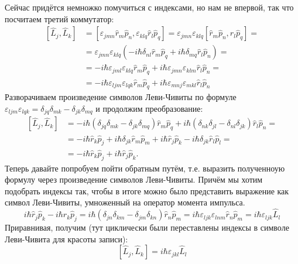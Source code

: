 Сейчас придётся немножко помучиться с индексами, но нам не впервой, так что посчитаем третий коммутатор:
\begin{align*}
    \left[\hat{L}_j, \hat{L}_k\right] &= [\varepsilon_{jmn} \hat{r}_m \hat{p}_n, \varepsilon_{klq} \hat{r}_l\hat{p}_q] = \varepsilon_{jmn}\varepsilon_{klq}[\hat{r}_m \hat{p}_n, \hat{r}_l\hat{p}_q] =\\
    &= \varepsilon_{jmn}\varepsilon_{klq}(-i\hbar\delta_{nl}\hat{r}_m\hat{p}_q + i\hbar\delta_{mq}\hat{r}_l\hat{p}_n) =\\
    &= -i\hbar \varepsilon_{jml}\varepsilon_{klq}\hat{r}_m\hat{p}_q + i\hbar\varepsilon_{jmn}\varepsilon_{klm}\hat{r}_l\hat{p}_n =\\ 
    &= -i\hbar\varepsilon_{ljm}\varepsilon_{lqk}\hat{r}_m\hat{p}_q + i\hbar\varepsilon_{mnj}\varepsilon_{mkl}\hat{r}_l\hat{p}_n
\end{align*}
Разворачиваем произведение символов Леви-Чивиты по формуле $\varepsilon_{ljm}\varepsilon_{lqk} = \delta_{jq}\delta_{mk} - \delta_{jk}\delta_{mq}$ и продолжим преобразование:
\begin{align*}
    \left[\hat{L}_j, \hat{L}_k\right] &= 
    -i\hbar(\delta_{jq}\delta_{mk} - \delta_{jk}\delta_{mq})\hat{r}_m\hat{p}_q + i\hbar(\delta_{nk}\delta_{jl} - \delta_{nl}\delta_{jk})\hat{r}_l\hat{p}_n =\\
    &= -i\hbar\hat{r}_k\hat{p}_j + i\hbar\delta_{jk}\hat{r}_m\hat{p}_m + i\hbar\hat{r}_j\hat{p}_k - i\hbar\delta_{jk}\hat{r}_l\hat{p}_l =\\
    &= -i\hbar\hat{r}_k\hat{p}_j + i\hbar\hat{r}_j\hat{p}_k.
\end{align*}
Теперь давайте попробуем пойти обратным путём, т.е. выразить полученноую формулу через произведение символов Леви-Чивиты. Причём мы хотим подобрать индексы так, чтобы в итоге можно было представить выражение как символ Леви-Чивиты, умноженный на оператор момента импульса.
\[
i\hbar\hat{r}_j\hat{p}_k - i\hbar\hat{r}_k\hat{p}_j = i\hbar(\delta_{jn}\delta_{km} - \delta_{jm}\delta_{kn})\hat{r}_n\hat{p}_m = i\hbar\varepsilon_{ljk}\varepsilon_{lnm}\hat{r}_n\hat{p}_m = i\hbar\varepsilon_{ljk}\hat{L}_l
\]
Приравнивая, получим (тут циклически были переставлены индексы в символе Леви-Чивита для красоты записи):
\[
\left[\hat{L}_j, \hat{L}_k\right] = i\hbar\varepsilon_{jkl}\hat{L}_l
\]

